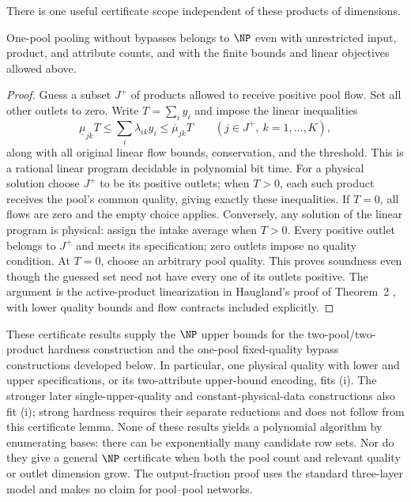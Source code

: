 There is one useful certificate scope independent of these products
of dimensions.
\begin{proposition}\label{s2:no-bypass-np}
One-pool pooling without bypasses belongs to $\NP$ even with
unrestricted input, product, and attribute counts, and with the finite
bounds and linear objectives allowed above.
\end{proposition}
\begin{proof}
Guess a subset $J^+$ of products allowed to receive positive pool flow.
Set all other outlets to zero. Write $T=\sum_i y_i$ and impose the
linear inequalities
\[
 \underline\mu_{jk}T\le\sum_i\lambda_{ik}y_i
   \le\overline\mu_{jk}T\qquad(j\in J^+,\ k=1,\ldots,K),
\]
along with all original linear flow bounds, conservation, and the
threshold. This is a rational linear program decidable in polynomial
bit time. For a physical solution choose $J^+$ to be its positive
outlets; when $T>0$, each such product receives the pool's common
quality, giving exactly these inequalities. If $T=0$, all flows are
zero and the empty choice applies. Conversely, any solution of the
linear program is physical: assign the intake average when $T>0$.
Every positive outlet belongs to $J^+$ and meets its specification;
zero outlets impose no quality condition. At $T=0$, choose an arbitrary
pool quality. This proves soundness even though the guessed set need
not have every one of its outlets positive. The argument is the
active-product linearization in Haugland's proof of Theorem~2
\citep{haugland2016-the-computational-complexity-of-the}, with lower
quality bounds and flow contracts included explicitly.
\end{proof}

These certificate results supply the $\NP$ upper bounds for the
two-pool/two-product hardness construction and the one-pool
fixed-quality bypass constructions developed below. In particular,
one physical quality with lower and upper specifications, or its
two-attribute upper-bound encoding, fits (i). The stronger later
single-upper-quality and constant-physical-data constructions also
fit (i); strong hardness requires their separate reductions and does
not follow from this certificate lemma. None of these results yields
a polynomial algorithm by enumerating bases: there can be
exponentially many candidate row sets. Nor do they give a general
$\NP$ certificate when both the pool count and relevant quality or
outlet dimension grow. The output-fraction proof uses the standard
three-layer model and makes no claim for pool--pool networks.
